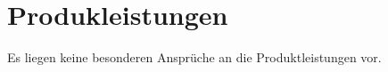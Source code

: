 \section{Produkleistungen}
\label{sec:Produktleistungen}

Es liegen keine besonderen Ansprüche an die Produktleistungen vor.